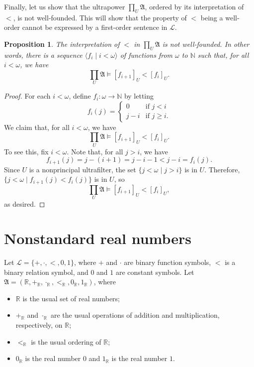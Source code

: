 \documentclass[a4paper]{memoir}
\newtheorem{proposition}[theorem]{Proposition}
\theoremstyle{definition}
\newcommand{\bb}{\mathbb}
\newcommand{\mc}{\mathcal}
\newcommand{\ra}{\rightarrow}
\begin{document}
Finally, let us show that the ultrapower $\prod_U \mathfrak{A}$, ordered by its interpretation 
of $<$, is not well-founded. This will show that the property of $<$ being a well-order cannot 
be expressed by a first-order sentence in $\mc{L}$.

\begin{proposition}
  The interpretation of $<$ in $\prod_U \mathfrak{A}$ is not well-founded. In other words, 
  there is a sequence $\langle f_i \mid i < \omega \rangle$ of functions from 
  $\omega$ to $\bb{N}$ such that, for all $i < \omega$, we have
  \[
    \prod_U \mathfrak{A} \models [f_{i+1}]_U < [f_i]_U.
  \]
\end{proposition}

\begin{proof}
  For each $i < \omega$, define $f_i : \omega \ra \bb{N}$ by letting 
  \[
    f_i(j) = \begin{cases}
      0 & \text{if } j < i \\
      j-i & \text{if } j \geq i.
    \end{cases}
  \]
  We claim that, for all $i < \omega$, we have
  \[
    \prod_U \mathfrak{A} \models [f_{i+1}]_U < [f_i]_U.
  \]
  To see this, fix $i < \omega$. Note that, for all $j > i$, we have
  \[
    f_{i+1}(j) = j - (i + 1) = j - i - 1 < j - i = f_i(j).
  \]
  Since $U$ is a nonprincipal ultrafilter, the set $\{j < \omega \mid j > i\}$ is in $U$. 
  Therefore, $\{j < \omega \mid f_{i+1}(j) < f_i(j)\}$ is in $U$, so 
  \[
    \prod_U \mathfrak{A} \models [f_{i+1}]_U < [f_i]_U,
  \]
  as desired.
\end{proof}

\section{Nonstandard real numbers}

Let $\mc{L} = \{+, \cdot, <, 0, 1\}$, where $+$ and $\cdot$ are binary function symbols, 
$<$ is a binary relation symbol, and $0$ and $1$ are constant symbols. Let 
$\mathfrak{A} = (\bb{R}, +_{\bb{R}}, \cdot_{\bb{R}}, <_{\bb{R}}, 0_{\bb{R}}, 1_{\bb{R}})$, 
where
\begin{itemize}
  \item $\bb{R}$ is the usual set of real numbers;
  \item $+_{\bb{R}}$ and $\cdot_{\bb{R}}$ are the usual operations of addition and multiplication, 
  respectively, on $\bb{R}$;
  \item $<_{\bb{R}}$ is the usual ordering of $\bb{R}$;
  \item $0_{\bb{R}}$ is the real number $0$ and $1_{\bb{R}}$ is the real number $1$.
\end{itemize}
\end{document}
